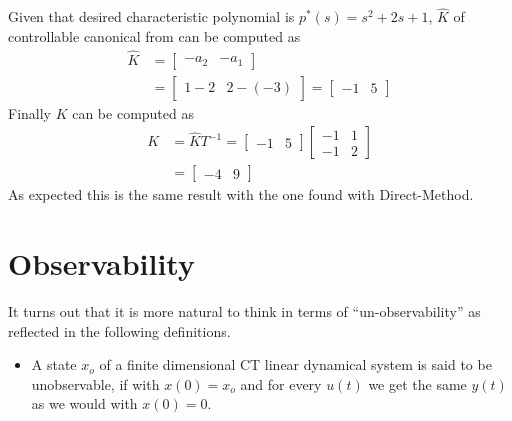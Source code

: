 \documentclass[twoside]{article}
\begin{document}
%
Given that desired characteristic polynomial is $p^*(s) = s^2 + 2 s + 1$,
$\hat{K}$ of controllable canonical from can be computed as
%
\begin{align*}
  \hat{K} &= \left[ \begin{array}{cc} - a_2 & -
                                                       a_1 \end{array}
                                                       \right]
\\
&= \left[ \begin{array}{ccc} 1-2 & 2-(-3) \end{array}
                                                       \right]
= \left[ \begin{array}{ccc} -1 & 5 \end{array}
                                                       \right]
\end{align*}
%
Finally $K$ can be computed as
%
\begin{align*}
  K &= \hat{K} T^{-1} = \left[ \begin{array}{ccc} -1 & 5 \end{array}
                                                       \right]
\left[ \begin{array}{cc} -1 & 1 \\ -1 & 2 \end{array} \right]
\\
&= \left[ \begin{array}{ccc} -4 & 9 \end{array}
                                                       \right]
\end{align*}
%
As expected this is the same result with the one found with Direct-Method.

\newpage

\section{Observability}

It turns out that it is more natural to think in terms of
``un-observability'' as reflected in the following definitions.

\begin{itemize}
  \item A state $x_o$ of a finite dimensional CT linear dynamical
    system is said to be unobservable, if with $x(0) = x_o$ and
    for every $u(t)$ we get the same $y(t)$ as we would with $x(0) =
    0$. 
\end{itemize}
\end{document}
